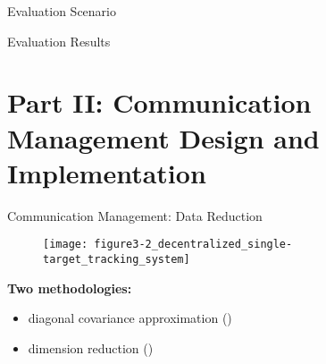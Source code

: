 \documentclass[aspectratio=1610]{beamer}
\begin{document}
\begin{frame}{Evaluation Scenario}

\begin{figure}
    \begin{tikzpicture}[scale=.5]
        
    \end{tikzpicture}
\end{figure}

\end{frame}


\begin{frame}{Evaluation Results}

\begin{figure}
    \begin{tikzpicture}[xscale=.25,yscale=1.2]
        
    \end{tikzpicture}
\end{figure}

\end{frame}






\section{Part II: Communication Management Design and Implementation}


\begin{frame}{Communication Management: Data Reduction}

\begin{figure}
    \texttt{[image: figure3-2\_decentralized\_single-target\_tracking\_system]}
\end{figure}

\textbf{Two methodologies:}
\begin{itemize}
    \item diagonal covariance approximation (\abbrDCA)
    \item dimension reduction (\abbrDR)
\end{itemize}

\end{frame}
\end{document}

